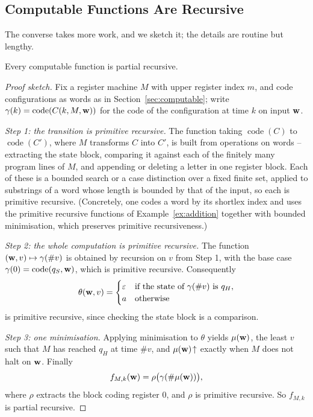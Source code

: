 \documentclass[a4paper]{scrartcl}
\newcommand{\code}{\operatorname{code}}
\newcommand{\eps}{\varepsilon}
\begin{document}
\subsection{Computable Functions Are Recursive}

The converse takes more work, and we sketch it; the details are routine but lengthy.

\begin{theorem}\label{thm:computablerecursive}
	Every computable function is partial recursive.
\end{theorem}

\begin{proof}[Proof sketch]
	Fix a register machine $M$ with upper register index $m$, and code configurations as words as in Section~\ref{sec:computable}; write $\gamma(k) = \code(C(k,M,\vv w))$ for the code of the configuration at time $k$ on input $\mathbf{w}$.

	\emph{Step 1: the transition is primitive recursive.} The function taking $\code(C)$ to $\code(C')$, where $M$ transforms $C$ into $C'$, is built from operations on words -- extracting the state block, comparing it against each of the finitely many program lines of $M$, and appending or deleting a letter in one register block. Each of these is a bounded search or a case distinction over a fixed finite set, applied to substrings of a word whose length is bounded by that of the input, so each is primitive recursive. (Concretely, one codes a word by its shortlex index and uses the primitive recursive functions of Example~\ref{ex:addition} together with bounded minimisation, which preserves primitive recursiveness.)

	\emph{Step 2: the whole computation is primitive recursive.} The function $(\mathbf{w}, v) \mapsto \gamma(\#v)$ is obtained by recursion on $v$ from Step 1, with the base case $\gamma(0) = \code(q_S,\vv w)$, which is primitive recursive. Consequently
	$$\theta(\vv w, v) = \begin{cases}\eps & \text{if the state of } \gamma(\#v) \text{ is } q_H, \\ a & \text{otherwise}\end{cases}$$
	is primitive recursive, since checking the state block is a comparison.

	\emph{Step 3: one minimisation.} Applying minimisation to $\theta$ yields $\mu(\mathbf{w})$, the least $v$ such that $M$ has reached $q_H$ at time $\#v$, and $\mu(\mathbf{w})\!\uparrow$ exactly when $M$ does not halt on $\mathbf{w}$. Finally
	$$f_{M,k}(\mathbf{w}) = \rho\big(\gamma(\#\mu(\mathbf{w}))\big),$$
	where $\rho$ extracts the block coding register $0$, and $\rho$ is primitive recursive. So $f_{M,k}$ is partial recursive.
\end{proof}
\end{document}
